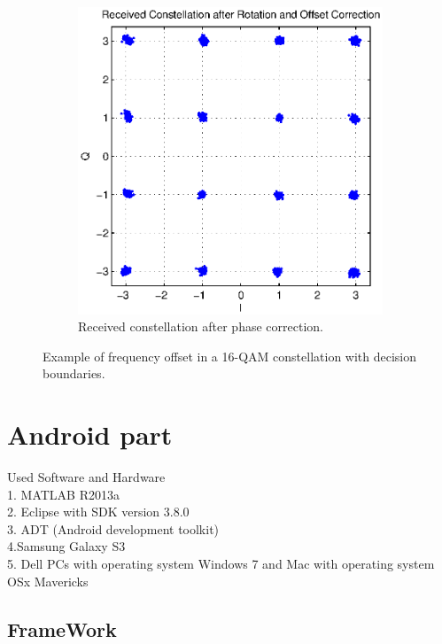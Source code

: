 \documentclass[12pt,a4paper,openright]{article}
\begin{document}
\begin{figure}[h]
\begin{subfigure}{0.32\textwidth}
 \centering
    \includegraphics[width=0.8\linewidth]{rx_const_after.eps}
    \caption{Received constellation after phase correction.}
    \label{PD}
    \end{subfigure}
    \caption{Example of frequency offset in a 16-QAM constellation with decision boundaries.  }
    \label{phaseoff}
\end{figure}


\clearpage

\section{Android part}

Used Software and Hardware \\

1. MATLAB R2013a \\
2. Eclipse with SDK version 3.8.0 \\
3. ADT (Android development toolkit) \\
4.Samsung Galaxy S3 \\
5. Dell PCs with operating system Windows 7 and Mac with operating system OSx Mavericks \\


\subsection{FrameWork}
\end{document}
